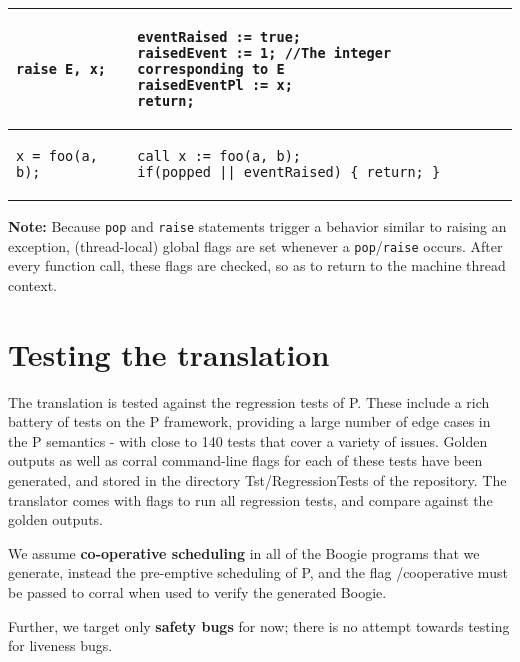 \documentclass{llncs}
\providecommand{\tabularnewline}{\\}
\begin{document}
\begin{tabular}{|p{}|p{}|}
\begin{verbatim}
raise E, x; 
\end{verbatim}
& 
\begin{verbatim}
eventRaised := true;
raisedEvent := 1; //The integer corresponding to E
raisedEventPl := x; 
return;
\end{verbatim}
\tabularnewline
\hline 

\begin{verbatim}
x = foo(a, b);
\end{verbatim}
&
\begin{verbatim}
call x := foo(a, b);
if(popped || eventRaised) { return; }
\end{verbatim}
\tabularnewline
\hline



\end{tabular}


\noindent
\textbf{Note:} Because \texttt{pop} and \texttt{raise} statements trigger a behavior similar to raising an exception, \newline (thread-local) global flags are set whenever a \texttt{pop}/\texttt{raise} occurs. After every function call, these flags are checked, so as to return to the machine thread context. \newline \newline \newline

\pagebreak

\section{Testing the translation}
The translation is tested against the regression tests of P. These include a rich battery of tests on the P framework, providing a large number of edge cases in the P semantics - with close to 140 tests that cover a variety of issues. Golden outputs as well as corral command-line flags for each of these tests have been generated, and stored in the directory \textsf{Tst/RegressionTests} of the repository. The translator comes with flags to run all regression tests, and compare against the golden outputs. 

We assume \textbf{co-operative scheduling} in all of the Boogie programs that we generate, instead the pre-emptive scheduling of P, and the flag \textsf{/cooperative} must be passed to corral when used to verify the generated Boogie.

Further, we target only \textbf{safety bugs} for now; there is no  attempt towards testing for liveness bugs.
\end{document}
